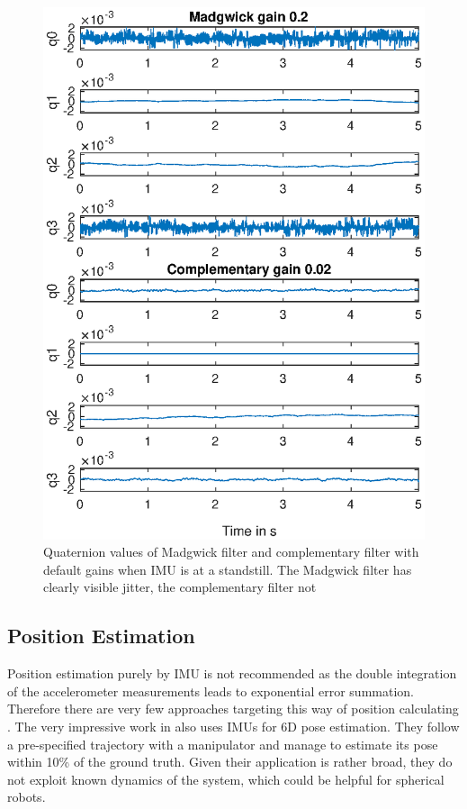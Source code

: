 \documentclass[letterpaper, 10 pt, conference]{ieeeconf}  %
\begin{document}
\begin{figure}
\includegraphics[width=\linewidth]{./graphics/MadgwickVsComplementaryNoMovement.eps}
\caption{Quaternion values of Madgwick filter and complementary filter with default gains when IMU is at a standstill. The Madgwick filter has clearly visible jitter, the complementary filter not}
\label{madgVsComp1}
\end{figure}



\subsection{Position Estimation}
Position estimation purely by IMU is not recommended as the double integration of the accelerometer measurements leads to exponential error summation.
Therefore there are very few approaches targeting this way of position calculating \cite{kok2017IMU}.
The very impressive work in \cite{valencia2017simpleIMU} also uses IMUs for 6D pose estimation.
They follow a pre-specified trajectory with a manipulator and manage to estimate its pose within 10\% of the ground truth.
Given their application is rather broad, they do not exploit known dynamics of the system, which could be helpful for spherical robots.
\end{document}
